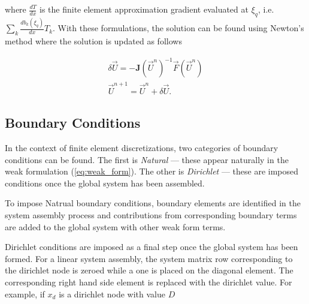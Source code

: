 \documentclass[11pt]{style/memo}
\begin{document}
where $\frac{dT}{dx}$ is the finite element approximation gradient evaluated at $\xi_q$, i.e. $\sum_k \frac{db_k(\xi_q)}{dx}T_k$. With these
formulations, the solution can be found using Newton's method where the solution is updated as follows

\begin{equation}
\begin{gathered}
    \delta\vec{U} = - \mathbf{J}{(\vec{U}^{n})}^{-1}\vec{F}(\vec{U}^{n}) \\
    \vec{U}^{n+1} = \vec{U}^{n} + \delta\vec{U}.
\end{gathered}
\end{equation}

\subsection{Boundary  Conditions}\label{sec:bcs}
In the context of finite element discretizations, two categories of boundary conditions can be found.
The first is \emph{Natural} --- these appear naturally in the weak formulation (\ref{eq:weak_form}).
The other is \emph{Dirichlet} --- these are imposed conditions once the global system has been
assembled.

\hspace{1em} To impose Natrual boundary conditions, boundary elements are identified in the system assembly process
and contributions from corresponding boundary terms are added to the global system with other weak
form terms.

\hspace{1em} Dirichlet conditions are imposed as a final step once the global system has been formed. For a linear
system assembly, the system matrix row corresponding to the dirichlet node is zeroed while a one is
placed on the diagonal element. The corresponding right hand side element is replaced with the dirichlet
value. For example, if $x_d$ is a dirichlet node with value $D$
\end{document}
